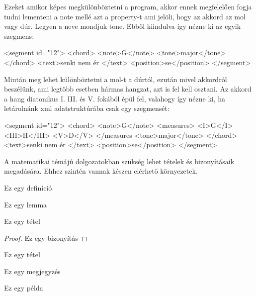 Ezeket amikor képes megkülönböztetni a program, akkor ennek megfelelően fogja tudni lementeni a note mellé azt a property-t ami jelöli, hogy az akkord az mol vagy dúr. Legyen a neve mondjuk tone. Ebből kiindulva így nézne ki az egyik szegmens:
\begin{xml}
<segment id="12">
  <chord>
    <note>G</note>
    <tone>major</tone>
  </chord>
  <text>senki nem ér </text>
  <position>se</position>
</segment>
\end{xml}

Miután meg lehet különböztetni a mol-t a dúrtól, ezután mivel akkordról beszélünk, ami legtöbb esetben hármas hangzat, azt is fel kell osztani. Az akkord a hang diatonikus I. III. és V. fokából épül fel, valahogy így nézne ki, ha letárolnánk xml adatstruktúrába csak egy szegmensét:
\begin{xml}
<segment id="12">
  <chord>
    <note>G</note>
    <measures>
    	<I>G</I>
    	<III>H</III>
    	<V>D</V>
    </measures
    <tone>major</tone>
  </chord>
  <text>senki nem ér </text>
  <position>se</position>
</segment>
\end{xml}



A matematikai témájú dolgozatokban szükség lehet tételek és bizonyításaik megadására.
Ehhez szintén vannak készen elérhető környezetek.

\begin{definition}
Ez egy definíció
\end{definition}

\begin{lemma}
Ez egy lemma
\end{lemma}

\begin{theorem}
Ez egy tétel
\end{theorem}

\begin{proof}
Ez egy bizonyítás
\end{proof}

\begin{corollary}
Ez egy tétel
\end{corollary}

\begin{remark}
Ez egy megjegyzés
\end{remark}

\begin{example}
Ez egy példa
\end{example}
